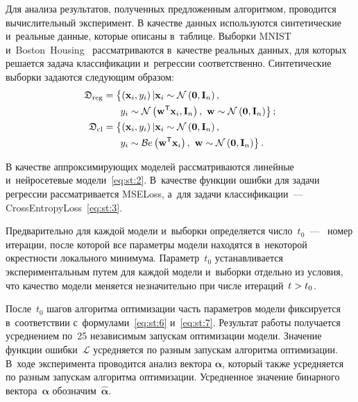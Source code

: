 \begin{multicols}{2}
Для анализа результатов, полученных предложенным алгоритмом, проводится 
вычислительный эксперимент. В качестве данных используются синтетические 
и~реальные данные, которые описаны в~таблице. Выборки MNIST~\cite{mnist} 
и~Boston~Housing~\cite{Boston} рассматриваются в~качестве реальных 
данных, для которых решается задача классификации и~регрессии 
соответственно. Синтетические выборки задаются следующим образом:
\begin{align*}
\mathfrak{D}_{\mathrm{reg}} &= \bigl\{\left(\mathbf{x}_i, y_i \right) 
|\mathbf{x}_{i}\sim\mathcal{N}\left(\mathbf{0}, 
\mathbf{I}_{n}\right),\\
&\left.\hspace*{15pt}y_{i}\sim\mathcal{N}\left(\mathbf{w}^{\mathsf{T}}
\mathbf{x}_{i}, \mathbf{I}_{n}\right),~ \mathbf{w} \sim 
\mathcal{N}\left(\mathbf{0}, \mathbf{I}_{n}\right)\right\};\\
\mathfrak{D}_{\mathrm{cl}} &= \bigl\{\left(\mathbf{x}_i, y_i \right) 
|\mathbf{x}_{i}\sim\mathcal{N}\left(\mathbf{0}, 
\mathbf{I}_{n}\right),\\
&\left.\hspace*{15pt}y_{i}\sim\mathcal{B}e\left(\mathbf{w}^{\mathsf{T}}
\mathbf{x}_{i}\right),~ \mathbf{w} \sim \mathcal{N}\left(\mathbf{0}, 
\mathbf{I}_{n}\right)\right\}.
\end{align*}

В качестве аппроксимирующих моделей рас\-смат\-ри\-ва\-ют\-ся линейные 
и~нейросетевые модели~\eqref{eq:st:2}. В~качестве функции ошибки для 
задачи регрессии рассматривается MSELoss, а~для задачи классификации~--- 
CrossEntropyLoss~\eqref{eq:st:3}.

Предварительно для каждой модели и~выборки определяется число~$t_0$~---
~номер итерации, после которой все параметры модели находятся в~некоторой 
окрестности локального минимума. Параметр~$t_0$ устанавливается 
экспериментальным путем для каж\-дой модели и~выборки отдельно из условия, 
что качество модели меняется незначительно при числе итераций~$t\hm>t_0$.

После~$t_0$ шагов алгоритма оптимизации часть параметров модели 
фиксируется в~соответствии с~формулами~\eqref{eq:st:6} и~\eqref{eq:st:7}. 
Результат работы получается усреднением по~25 независимым запускам 
оптимизации модели. Значение функции ошибки~$\mathcal{L}$ усредняется по 
разным запускам алгоритма оптимизации. В~ходе эксперимента проводится 
анализ вектора $\boldsymbol{\alpha}$, который также усредняется по разным 
запускам алгоритма оптимизации. Усредненное значение бинарного 
вектора~$\boldsymbol{\alpha}$ обозначим~$\hat{\boldsymbol{\alpha}}$.





\end{multicols}
